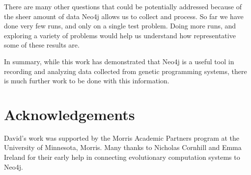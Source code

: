 \documentclass[12pt]{article}
\begin{document}
There are many other questions that could be potentially addressed because of the sheer amount of data Neo4j allows us to collect and process. So far we have done very few runs, and only on a single test problem. Doing more runs, and exploring a variety of problems would help us understand how representative some of these results are.

In summary, while this work has demonstrated that Neo4j is a useful tool in recording and analyzing data collected from genetic programming systems, there is much further work to be done with this information.

\section*{Acknowledgements}

David's work was supported by the Morris Academic Partners program at the University of Minnesota, Morris. Many thanks to Nicholas Cornhill and Emma Ireland for their early help in connecting evolutionary computation systems to Neo4j.

\pagebreak



\end{document}
